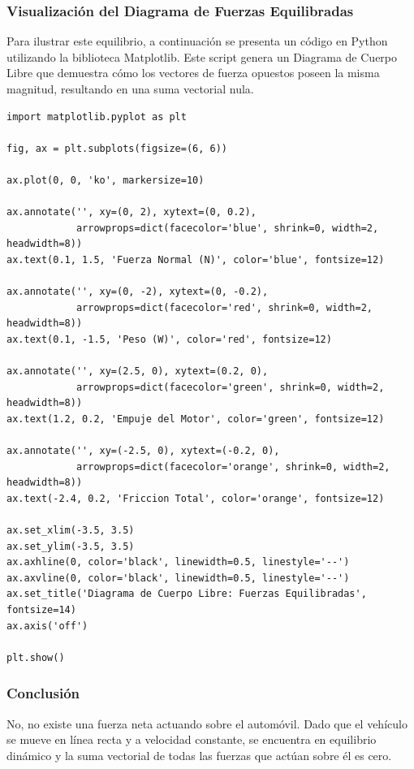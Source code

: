 \documentclass[12pt]{article}
\begin{document}
\subsubsection*{Visualización del Diagrama de Fuerzas Equilibradas}
Para ilustrar este equilibrio, a continuación se presenta un código en Python utilizando la biblioteca Matplotlib. Este script genera un Diagrama de Cuerpo Libre que demuestra cómo los vectores de fuerza opuestos poseen la misma magnitud, resultando en una suma vectorial nula.

\begin{lstlisting}
import matplotlib.pyplot as plt

fig, ax = plt.subplots(figsize=(6, 6))

ax.plot(0, 0, 'ko', markersize=10)

ax.annotate('', xy=(0, 2), xytext=(0, 0.2), 
            arrowprops=dict(facecolor='blue', shrink=0, width=2, headwidth=8))
ax.text(0.1, 1.5, 'Fuerza Normal (N)', color='blue', fontsize=12)

ax.annotate('', xy=(0, -2), xytext=(0, -0.2), 
            arrowprops=dict(facecolor='red', shrink=0, width=2, headwidth=8))
ax.text(0.1, -1.5, 'Peso (W)', color='red', fontsize=12)

ax.annotate('', xy=(2.5, 0), xytext=(0.2, 0), 
            arrowprops=dict(facecolor='green', shrink=0, width=2, headwidth=8))
ax.text(1.2, 0.2, 'Empuje del Motor', color='green', fontsize=12)

ax.annotate('', xy=(-2.5, 0), xytext=(-0.2, 0), 
            arrowprops=dict(facecolor='orange', shrink=0, width=2, headwidth=8))
ax.text(-2.4, 0.2, 'Friccion Total', color='orange', fontsize=12)

ax.set_xlim(-3.5, 3.5)
ax.set_ylim(-3.5, 3.5)
ax.axhline(0, color='black', linewidth=0.5, linestyle='--')
ax.axvline(0, color='black', linewidth=0.5, linestyle='--')
ax.set_title('Diagrama de Cuerpo Libre: Fuerzas Equilibradas', fontsize=14)
ax.axis('off')

plt.show()
\end{lstlisting}

\subsubsection*{Conclusión}
No, no existe una fuerza neta actuando sobre el automóvil. Dado que el vehículo se mueve en línea recta y a velocidad constante, se encuentra en equilibrio dinámico y la suma vectorial de todas las fuerzas que actúan sobre él es cero.
\end{document}
